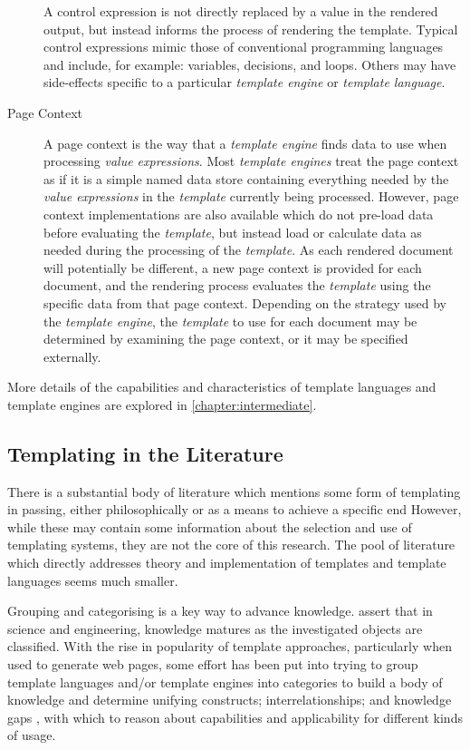 \begin{description}
A control expression is not directly replaced by a value in the rendered output, but instead informs the process of rendering the template. Typical control expressions mimic those of conventional programming languages and include, for example: variables, decisions, and loops. Others may have side-effects specific to a particular \emph{template engine} or \emph{template language}.

\item[Page Context] 

A page context is the way that a \emph{template engine} finds data to use when processing \emph{value expressions}. Most \emph{template engines} treat the page context as if it is a simple named data store containing everything needed by the \emph{value expressions} in the \emph{template} currently being processed. However, page context implementations are also available which do not pre-load data before evaluating the \emph{template}, but instead load or calculate data as needed during the processing of the \emph{template}. As each rendered document will potentially be different, a new page context is provided for each document, and the rendering process evaluates the \emph{template} using the specific data from that page context. Depending on the strategy used by the \emph{template engine}, the \emph{template} to use for each document may be determined by examining the page context, or it may be specified externally.

\end{description}

More details of the capabilities and characteristics of template languages and template engines are explored in \autoref{chapter:intermediate}.

\subsection{Templating in the Literature}

There is a substantial body of literature which mentions some form of templating in passing, either philosophically \citep{Bush1945} \citep{Nelson1974} or as a means to achieve a specific end \citep{Caldwell1998} However, while these may contain some information about the selection and use of templating systems, they are not the core of this research. The pool of literature which directly addresses theory and implementation of templates and template languages seems much smaller.

Grouping and categorising is a key way to advance knowledge. \citet{Vegas2009} assert that in science and engineering, knowledge matures as the investigated objects are classified. With the rise in popularity of template approaches, particularly when used to generate web pages, some effort has been put into trying to group template languages and/or template engines into categories to build a body of knowledge and determine unifying constructs; interrelationships; and knowledge gaps \citep{Vegas2009}, with which to reason about capabilities and applicability for different kinds of usage.

